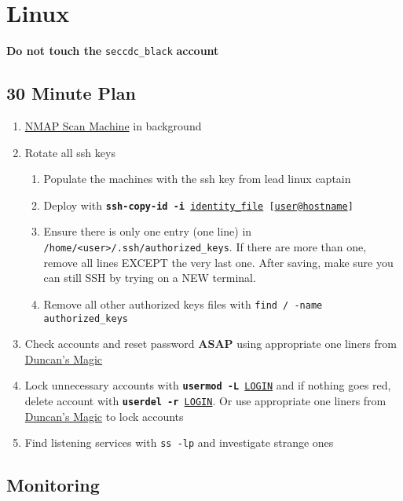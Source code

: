 \documentclass[12pt,letterpaper]{article}
\def\code#1{\textcolor{iris}{\texttt{#1}}}
\def\bf#1{\textbf{#1}}
\def\ul#1{\underline{#1}}
\begin{document}
\pagebreak

\section{Linux}

\bf{Do not touch the} \code{seccdc\_black} \bf{account}

\subsection{30 Minute Plan}

\begin{enumerate}
	\item \hyperref[nmap]{NMAP Scan Machine} in background
	\item Rotate all ssh keys
		\begin{enumerate}
			\item Populate the machines with the ssh key from lead linux captain
			\item Deploy with \code{\bf{ssh-copy-id -i} \ul{identity\_file} [\ul{user}@\ul{hostname}]}
			\item Ensure there is only one entry (one line) in \code{/home/<user>/.ssh/authorized\_keys}. If there are more than one, remove all lines EXCEPT the very last one. After saving, make sure you can still SSH by trying on a NEW terminal.
			\item Remove all other authorized keys files with \code{find / -name authorized\_keys}
		\end{enumerate}
	\item Check accounts and reset password \bf{ASAP} using appropriate one liners from \hyperref[subsec:dmagic]{Duncan's Magic}
	\item Lock unnecessary accounts with \code{\bf{usermod -L} \ul{LOGIN}} and if nothing goes red, delete account with \code{\bf{userdel -r} \ul{LOGIN}}. Or use appropriate one liners from \hyperref[subsec:dmagic]{Duncan's Magic} to lock accounts
	\item Find listening services with \code{ss -lp} and investigate strange ones
\end{enumerate}

\subsection{Monitoring}
\end{document}
